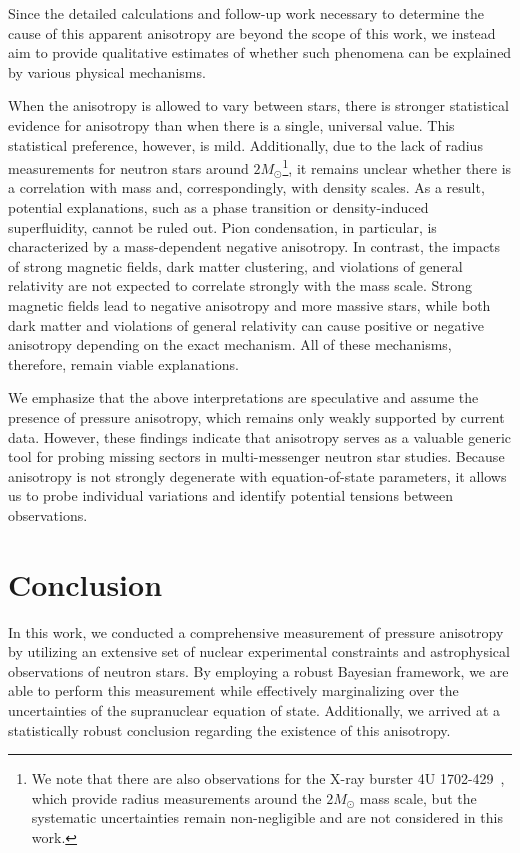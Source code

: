 \documentclass[prd,twocolumn,a4paper,floatfix,nofootinbib,preprintnumbers,superscriptaddress]{revtex4-1}
\begin{document}
Since the detailed calculations and follow-up work necessary to determine the cause of this apparent anisotropy are beyond the scope of this work, we instead aim to provide qualitative estimates of whether such phenomena can be explained by various physical mechanisms.

When the anisotropy is allowed to vary between stars, there is stronger statistical evidence for anisotropy than when there is a single, universal value. This statistical preference, however, is mild. Additionally, due to the lack of radius measurements for neutron stars around $2M_{\odot}$\footnote{We note that there are also observations for the X-ray burster 4U 1702-429~\cite{Nattila:2017wtj}, which provide radius measurements around the $2M_\odot$ mass scale, but the systematic uncertainties remain non-negligible and are not considered in this work.}, it remains unclear whether there is a correlation with mass and, correspondingly, with density scales. As a result, potential explanations,  such as a phase transition or density-induced superfluidity, cannot be ruled out. Pion condensation, in particular, is characterized by a mass-dependent negative anisotropy. In contrast, the impacts of strong magnetic fields, dark matter clustering, and violations of general relativity are not expected to correlate strongly with the mass scale. Strong magnetic fields lead to negative anisotropy and more massive stars, while both dark matter and violations of general relativity can cause positive or negative anisotropy depending on the exact mechanism. All of these mechanisms, therefore, remain viable explanations.

We emphasize that the above interpretations are speculative and assume the presence of pressure anisotropy, which remains only weakly supported by current data. However, these findings indicate that anisotropy serves as a valuable generic tool for probing missing sectors in multi-messenger neutron star studies. Because anisotropy is not strongly degenerate with equation-of-state parameters, it allows us to probe individual variations and identify potential tensions between observations.

\section{Conclusion}
\label{sec:conclusion}
In this work, we conducted a comprehensive measurement of pressure anisotropy by utilizing an extensive set of nuclear experimental constraints and astrophysical observations of neutron stars. By employing a robust Bayesian framework, we are able to perform this measurement while effectively marginalizing over the uncertainties of the supranuclear equation of state. Additionally, we arrived at a statistically robust conclusion regarding the existence of this anisotropy.
\end{document}
